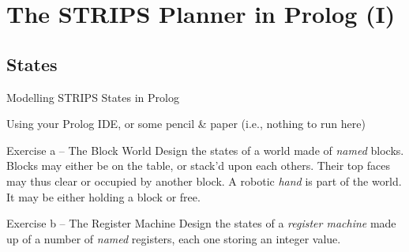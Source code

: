 \documentclass[presentation]{beamer}\mode<presentation>{\usetheme{AMSBolognaFC}}
\begin{document}
\section{The STRIPS Planner in Prolog (I)}

\subsection{States}

\begin{frame}[allowframebreaks]{Modelling STRIPS States in Prolog}

Using your Prolog IDE, or some pencil \& paper (i.e., nothing to run here)

\startExercise

\begin{block}{Exercise \currentExercise{}a -- The Block World}
   	Design the states of a world made of \emph{named} \alert{blocks}.
   	Blocks may either be on the \alert{table}, or stack'd up\alert{on} each others.
   	Their top faces may thus \alert{clear} or occupied by another block.
   	A robotic \emph{hand} is part of the world.
   	It may be either \alert{holding} a block or \alert{free}.
\end{block}

\begin{block}{Exercise \currentExercise{}b -- The Register Machine}
	Design the states of a \emph{register machine} made up of a number of \emph{named} \alert{registers}, each one storing an integer value.
\end{block}

\framebreak


\end{frame}
\end{document}

